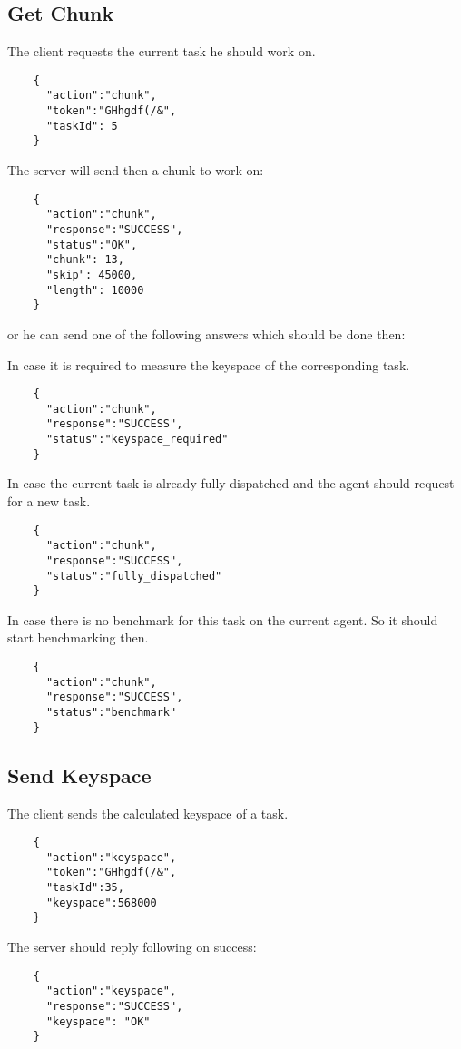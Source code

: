 \documentclass{article}
\begin{document}
	\subsection*{Get Chunk}
	The client requests the current task he should work on.
	\begin{verbatim}
	{
	  "action":"chunk", 
	  "token":"GHhgdf(/&",
	  "taskId": 5
	}
	\end{verbatim}
	The server will send then a chunk to work on:
	\begin{verbatim}
	{
	  "action":"chunk",
	  "response":"SUCCESS",
	  "status":"OK",
	  "chunk": 13,
	  "skip": 45000,
	  "length": 10000
	}
	\end{verbatim}
	or he can send one of the following answers which should be done then:
	
	In case it is required to measure the keyspace of the corresponding task.
	\begin{verbatim}
	{
	  "action":"chunk",
	  "response":"SUCCESS",
	  "status":"keyspace_required"
	}
	\end{verbatim}
	
	In case the current task is already fully dispatched and the agent should request for a new task.
	\begin{verbatim}
	{
	  "action":"chunk",
	  "response":"SUCCESS",
	  "status":"fully_dispatched"
	}
	\end{verbatim}
	
	In case there is no benchmark for this task on the current agent. So it should start benchmarking then.
	\begin{verbatim}
	{
	  "action":"chunk",
	  "response":"SUCCESS",
	  "status":"benchmark"
	}
	\end{verbatim}
	
	
	\subsection*{Send Keyspace}
	The client sends the calculated keyspace of a task.
	\begin{verbatim}
	{
	  "action":"keyspace",
	  "token":"GHhgdf(/&",
	  "taskId":35,
	  "keyspace":568000
	}
	\end{verbatim}
	The server should reply following on success:
	\begin{verbatim}
	{
	  "action":"keyspace",
	  "response":"SUCCESS",
	  "keyspace": "OK"
	}
	\end{verbatim}
	
\end{document}
